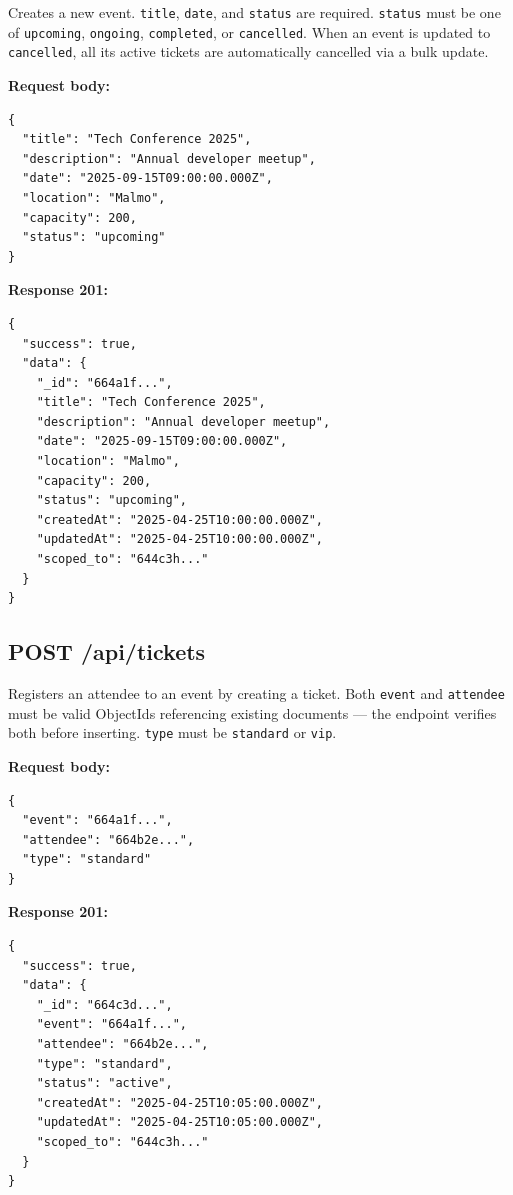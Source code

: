 \documentclass[12pt, a4paper]{article}
\begin{document}
Creates a new event. \texttt{title}, \texttt{date}, and \texttt{status} are
required. \texttt{status} must be one of \texttt{upcoming}, \texttt{ongoing},
\texttt{completed}, or \texttt{cancelled}. When an event is updated to
\texttt{cancelled}, all its active tickets are automatically cancelled via a
bulk update.

\textbf{Request body:}
\begin{lstlisting}[style=json]
{
  "title": "Tech Conference 2025",
  "description": "Annual developer meetup",
  "date": "2025-09-15T09:00:00.000Z",
  "location": "Malmo",
  "capacity": 200,
  "status": "upcoming"
}
\end{lstlisting}

\textbf{Response 201:}
\begin{lstlisting}[style=json]
{
  "success": true,
  "data": {
    "_id": "664a1f...",
    "title": "Tech Conference 2025",
    "description": "Annual developer meetup",
    "date": "2025-09-15T09:00:00.000Z",
    "location": "Malmo",
    "capacity": 200,
    "status": "upcoming",
    "createdAt": "2025-04-25T10:00:00.000Z",
    "updatedAt": "2025-04-25T10:00:00.000Z",
    "scoped_to": "644c3h..."
  }
}
\end{lstlisting}

\subsection{POST /api/tickets}

Registers an attendee to an event by creating a ticket. Both \texttt{event}
and \texttt{attendee} must be valid ObjectIds referencing existing documents
--- the endpoint verifies both before inserting. \texttt{type} must be
\texttt{standard} or \texttt{vip}.

\textbf{Request body:}
\begin{lstlisting}[style=json]
{
  "event": "664a1f...",
  "attendee": "664b2e...",
  "type": "standard"
}
\end{lstlisting}

\textbf{Response 201:}
\begin{lstlisting}[style=json]
{
  "success": true,
  "data": {
    "_id": "664c3d...",
    "event": "664a1f...",
    "attendee": "664b2e...",
    "type": "standard",
    "status": "active",
    "createdAt": "2025-04-25T10:05:00.000Z",
    "updatedAt": "2025-04-25T10:05:00.000Z",
    "scoped_to": "644c3h..."
  }
}
\end{lstlisting}

\end{document}
